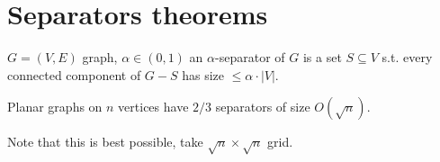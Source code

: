 \chapter{Separators theorems}

\begin{defn}
	$G = (V,E)$ graph, $\alpha \in (0,1)$ an $\alpha$-separator of $G$ is a set $S \subseteq V$ s.t. every connected component of $G - S$ has size $\leq \alpha \cdot |V|$.
\end{defn}

\begin{thm}
	Planar graphs on $n$ vertices have $2/3$ separators of size $O(\sqrt{n})$.
\end{thm}

\noindent Note that this is best possible, take $\sqrt{n} \times \sqrt{n}$ grid.

